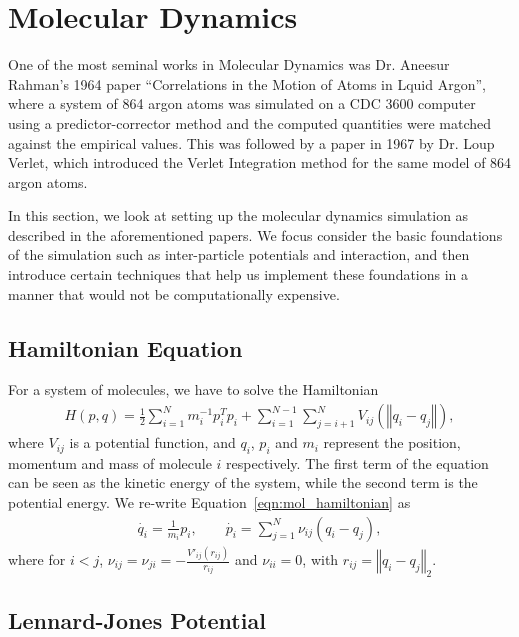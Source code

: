 \documentclass[../Main.tex]{subfiles}
\begin{document}
\section{Molecular Dynamics}

One of the most seminal works in Molecular Dynamics was Dr. Aneesur Rahman's 1964 paper \cite{Rahman1964} ``Correlations in the Motion of Atoms in Lquid Argon'', where a system of 864 argon atoms was simulated on a CDC 3600 computer using a predictor-corrector method and the computed quantities were matched against the empirical values. This was followed by a paper in 1967 \cite{Verlet1967} by Dr. Loup Verlet, which introduced the Verlet Integration method for the same model of 864 argon atoms.

In this section, we look at setting up the molecular dynamics simulation as described in the aforementioned papers. We focus consider the basic foundations of the simulation such as inter-particle potentials and interaction, and then introduce certain techniques that help us implement these foundations in a manner that would not be computationally expensive.

\subsection{Hamiltonian Equation}

For a system of molecules, we have to solve the Hamiltonian \cite{HarierLubichWanner2003}
\begin{align}
	H(p, q) = \frac{1}{2}\sum_{i = 1}^{N} m_{i}^{-1}p_{i}^{T}p_{i} + \sum_{i=1}^{N-1} \sum_{j=i+1}^{N} V_{ij}\left(\left\Vert q_{i} - q_{j} \right\Vert\right), \label{eqn:mol_hamiltonian}
\end{align} where $V_{ij}$ is a potential function, and $q_{i}$, $p_{i}$ and $m_{i}$ represent the position, momentum and mass of molecule $i$ respectively.
The first term of the equation can be seen as the kinetic energy of the system, while the second term is the potential energy. We re-write Equation~\ref{eqn:mol_hamiltonian} as
\begin{align}
	\dot{q_{i}} = \frac{1}{m_{i}}p_{i}, \quad \quad \dot{p_{i}} = \sum_{j=1}^{N}\nu_{ij}\left(q_{i} - q_{j}\right), \label{eqn:mol_hamiltonian_separate}
\end{align}where for $ i< j$, $ \nu_{ij} = \nu_{ji} = -\frac{V'_{ij}\left(r_{ij}\right)}{r_{ij}}$ and $\nu_{ii} = 0$, with $r_{ij} = \left\Vert q_{i} - q_{j} \right\Vert_{2}$.

\subsection{Lennard-Jones Potential}
\end{document}
